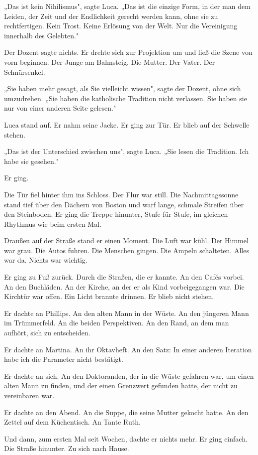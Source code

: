 \documentclass[
  ngerman,
]{article}
\begin{document}
„Das ist kein Nihilismus", sagte Luca. „Das ist die einzige Form, in der
man dem Leiden, der Zeit und der Endlichkeit gerecht werden kann, ohne
sie zu rechtfertigen. Kein Trost. Keine Erlösung von der Welt. Nur die
Vereinigung innerhalb des Gelebten."

Der Dozent sagte nichts. Er drehte sich zur Projektion um und ließ die
Szene von vorn beginnen. Der Junge am Bahnsteig. Die Mutter. Der Vater.
Der Schnürsenkel.

„Sie haben mehr gesagt, als Sie vielleicht wissen", sagte der Dozent,
ohne sich umzudrehen. „Sie haben die katholische Tradition nicht
verlassen. Sie haben sie nur von einer anderen Seite gelesen."

Luca stand auf. Er nahm seine Jacke. Er ging zur Tür. Er blieb auf der
Schwelle stehen.

„Das ist der Unterschied zwischen uns", sagte Luca. „Sie lesen die
Tradition. Ich habe sie gesehen."

Er ging.

Die Tür fiel hinter ihm ins Schloss. Der Flur war still. Die
Nachmittagssonne stand tief über den Dächern von Boston und warf lange,
schmale Streifen über den Steinboden. Er ging die Treppe hinunter, Stufe
für Stufe, im gleichen Rhythmus wie beim ersten Mal.

Draußen auf der Straße stand er einen Moment. Die Luft war kühl. Der
Himmel war grau. Die Autos fuhren. Die Menschen gingen. Die Ampeln
schalteten. Alles war da. Nichts war wichtig.

Er ging zu Fuß zurück. Durch die Straßen, die er kannte. An den Cafés
vorbei. An den Buchläden. An der Kirche, an der er als Kind
vorbeigegangen war. Die Kirchtür war offen. Ein Licht brannte drinnen.
Er blieb nicht stehen.

Er dachte an Phillips. An den alten Mann in der Wüste. An den jüngeren
Mann im Trümmerfeld. An die beiden Perspektiven. An den Rand, an dem man
aufhört, sich zu entscheiden.

Er dachte an Martina. An ihr Oktavheft. An den Satz: In einer anderen
Iteration habe ich die Parameter nicht bestätigt.

Er dachte an sich. An den Doktoranden, der in die Wüste gefahren war, um
einen alten Mann zu finden, und der einen Grenzwert gefunden hatte, der
nicht zu vereinbaren war.

Er dachte an den Abend. An die Suppe, die seine Mutter gekocht hatte. An
den Zettel auf dem Küchentisch. An Tante Ruth.

Und dann, zum ersten Mal seit Wochen, dachte er nichts mehr. Er ging
einfach. Die Straße hinunter. Zu sich nach Hause.
\end{document}
